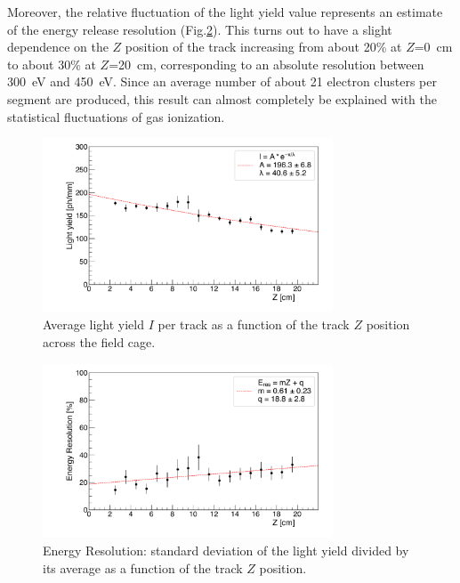 \documentclass[review]{elsarticle}
\begin{document}
  Moreover, the relative fluctuation of the light yield value represents an estimate of the energy release resolution (Fig.\ref{fig:energyresvsZ}). This turns out to have a slight dependence on the $Z$ position of the track increasing from about 20\% at $Z$=0~cm to about 30\% at $Z$=20~cm, corresponding to an absolute resolution between 300~eV and 450~eV.
  Since an average number of about 21 electron clusters per segment are produced, this result can almost completely be explained with the statistical fluctuations of gas ionization.

 \begin{figure}[!ht]
\centering
\includegraphics[width=3.4in]{Fig5-Photons-Z.pdf}
\caption{Average light yield $I$ per track as a function of the track $Z$ position across the field cage.}
\label{fig:lightvsZ}
\end{figure}

  \begin{figure}[!ht]
\centering
\includegraphics[width=3.4in]{Fig6-EnergyResultion-Z.pdf}
\caption{Energy Resolution: standard deviation of the light yield divided by its average as a function of the track $Z$ position.}
\label{fig:energyresvsZ}
\end{figure}
\end{document}
